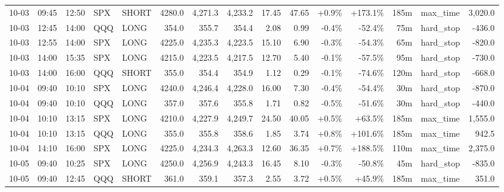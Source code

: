 \documentclass[11pt,a4paper,twoside]{article}
\begin{document}
\begin{landscape}
\begin{center}
\begin{longtable}{>{\color{txtmain}}l l l l l r r r r r r r r >{\color{txtmain}}l r}
10-03 & 09:45 & 12:50 & SPX & SHORT & 4280.0 & 4,271.3 & 4,233.2 & 17.45 & 47.65 & \textcolor{wingreen}{+0.9\%} & \textcolor{wingreen}{+173.1\%} & 185m & max\_time & \textcolor{wingreen}{3,020.0} \\
10-03 & 12:45 & 14:00 & QQQ & LONG & 354.0 & 355.7 & 354.4 & 2.08 & 0.99 & \textcolor{lossred}{-0.4\%} & \textcolor{lossred}{-52.4\%} & 75m & hard\_stop & \textcolor{lossred}{-436.0} \\
10-03 & 12:55 & 14:00 & SPX & LONG & 4225.0 & 4,235.3 & 4,223.5 & 15.10 & 6.90 & \textcolor{lossred}{-0.3\%} & \textcolor{lossred}{-54.3\%} & 65m & hard\_stop & \textcolor{lossred}{-820.0} \\
10-03 & 14:00 & 15:35 & SPX & LONG & 4215.0 & 4,223.5 & 4,217.5 & 12.70 & 5.40 & \textcolor{lossred}{-0.1\%} & \textcolor{lossred}{-57.5\%} & 95m & hard\_stop & \textcolor{lossred}{-730.0} \\
10-03 & 14:00 & 16:00 & QQQ & SHORT & 355.0 & 354.4 & 354.9 & 1.12 & 0.29 & \textcolor{lossred}{-0.1\%} & \textcolor{lossred}{-74.6\%} & 120m & hard\_stop & \textcolor{lossred}{-668.0} \\
10-04 & 09:40 & 10:10 & SPX & LONG & 4240.0 & 4,246.4 & 4,228.0 & 16.00 & 7.30 & \textcolor{lossred}{-0.4\%} & \textcolor{lossred}{-54.4\%} & 30m & hard\_stop & \textcolor{lossred}{-870.0} \\
10-04 & 09:40 & 10:10 & QQQ & LONG & 357.0 & 357.6 & 355.8 & 1.71 & 0.82 & \textcolor{lossred}{-0.5\%} & \textcolor{lossred}{-51.6\%} & 30m & hard\_stop & \textcolor{lossred}{-440.0} \\
10-04 & 10:10 & 13:15 & SPX & LONG & 4210.0 & 4,227.9 & 4,249.7 & 24.50 & 40.05 & \textcolor{wingreen}{+0.5\%} & \textcolor{wingreen}{+63.5\%} & 185m & max\_time & \textcolor{wingreen}{1,555.0} \\
10-04 & 10:10 & 13:15 & QQQ & LONG & 355.0 & 355.8 & 358.6 & 1.85 & 3.74 & \textcolor{wingreen}{+0.8\%} & \textcolor{wingreen}{+101.6\%} & 185m & max\_time & \textcolor{wingreen}{942.5} \\
10-04 & 14:10 & 16:00 & SPX & LONG & 4225.0 & 4,234.3 & 4,263.3 & 12.60 & 36.35 & \textcolor{wingreen}{+0.7\%} & \textcolor{wingreen}{+188.5\%} & 110m & max\_time & \textcolor{wingreen}{2,375.0} \\
10-05 & 09:40 & 10:25 & SPX & LONG & 4250.0 & 4,256.9 & 4,243.3 & 16.45 & 8.10 & \textcolor{lossred}{-0.3\%} & \textcolor{lossred}{-50.8\%} & 45m & hard\_stop & \textcolor{lossred}{-835.0} \\
10-05 & 09:40 & 12:45 & QQQ & SHORT & 361.0 & 359.1 & 357.3 & 2.55 & 3.72 & \textcolor{wingreen}{+0.5\%} & \textcolor{wingreen}{+45.9\%} & 185m & max\_time & \textcolor{wingreen}{351.0} \\

\end{longtable}
\end{center}
\end{landscape}
\end{document}
